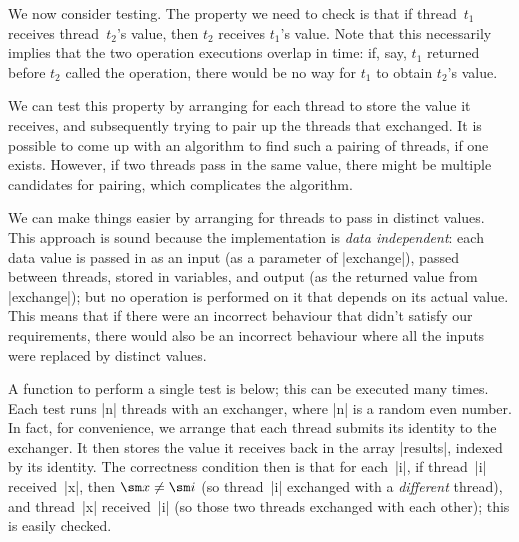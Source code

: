
We now consider testing.  The property we need to check is that if
thread~$t_1$ receives thread~$t_2$'s value, then $t_2$ receives $t_1$'s value.
Note that this necessarily implies that the two operation executions overlap
in time: if, say, $t_1$ returned before $t_2$ called the operation, there
would be no way for $t_1$ to obtain $t_2$'s value.  

We can test this property by arranging for each thread to store the value it
receives, and subsequently trying to pair up the threads that exchanged.  It
is possible to come up with an algorithm to find such a pairing of threads, if
one exists.
However, if two threads pass in the same value, there might be multiple
candidates for pairing, which complicates the algorithm.

We can make things easier by arranging for threads to pass in distinct values.
This approach is sound because the implementation is \emph{data independent}:
each data value is passed in as an input (as a parameter of |exchange|),
passed between threads, stored in variables, and output (as the returned value
from |exchange|); but no operation is
performed on it that depends on its actual value.  This means that if there
were an incorrect behaviour that didn't satisfy our requirements, there would
also be an incorrect behaviour where all the inputs were replaced by distinct
values.

A function to perform a single test is below; this can be executed many times.
Each test runs |n| threads with an exchanger, where |n| is a random even
number.  In fact, for convenience, we arrange that each thread submits its
identity to the exchanger.  It then stores the value it receives back in the
array |results|, indexed by its identity.  The correctness condition then is
that for each~|i|, if thread~|i| received~|x|, then $\sm x \ne \sm i$ (so
thread~|i| exchanged with a \emph{different} thread), and thread~|x|
received~|i| (so those two threads exchanged with each other); this is easily
checked.
%
%

